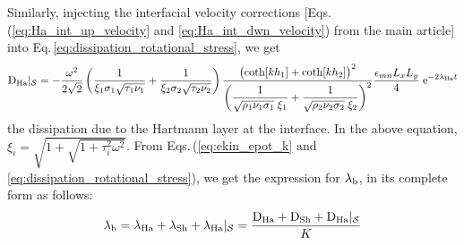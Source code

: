 \documentclass[aps,prfluids,reprint,superscriptaddress]{revtex4-2}
\newcommand{\ii}[1]{\text{#1}}
\newcommand{\mref}[1]{{\hypersetup{linkcolor=black}\ref{#1}}}
\numberwithin{equation}{section}
\begin{document}
Similarly, injecting the interfacial velocity corrections [Eqs.\,(\mref{eq:Ha_int_up_velocity} and \mref{eq:Ha_int_dwn_velocity}) from the main article] into Eq.\,\eqref{eq:dissipation_rotational_stress}, we get 
\begin{equation}
	\ii D_{\rm Ha}|_{\mathcal{S}} =
	-\frac{\omega^2}{2\sqrt{2}}
	\left( \frac{1}{\xi_1\sigma_1\sqrt{\tau_1\nu_1}}
	+
	\frac{1}{\xi_2\sigma_2\sqrt{\tau_2\nu_2}} 
	\right)
	\frac{\bigl( \text{coth}[kh_1] + \text{coth}[kh_2] \bigr)^2}
	{ \left(
		\dfrac{1}{\sqrt{\rho_1\nu_1\sigma_1}\;\xi_1} + 
		\dfrac{1}{\sqrt{\rho_2\nu_2\sigma_2}\;\xi_2}
		\right)^2
	}
	\frac{\epsilon_{mn}L_xL_y}{4}
	\; \ii{e}^{-2\lambda_{\rm{Ha}} t}
\end{equation}
the dissipation due to the Hartmann layer at the interface. In the above equation, $\xi_i = \sqrt{1 + \sqrt{1 + \tau_i^2\omega^2} }$. From Eqs.\,(\ref{eq:ekin_epot_k} and \ref{eq:dissipation_rotational_stress}), we get the expression for $\lambda_{\rm b}$, in its complete form as follows:
\begin{equation}
	\lambda_{\rm b} = \lambda_{\rm Ha} + \lambda_{\rm Sh} +\lambda_{\rm Ha}|_{\mathcal{S}}
	=
	\frac{\ii D_{\rm Ha}
	+ \ii D_{\rm Sh}  + \ii D_{\rm Ha}|_{\mathcal{S}}}{K} 
\end{equation}
\end{document}
